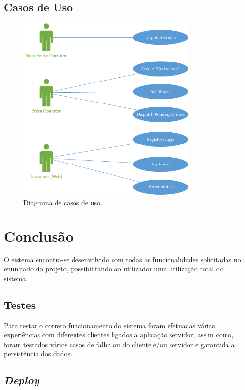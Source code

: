 \documentclass[12pt]{article}
\begin{document}
\subsection{Casos de Uso}
\begin{figure}[H]
    \centering
    \includegraphics[width=0.8\textwidth]{use.png}
    \caption{Diagrama de casos de uso.}
    \label{fig:use}
\end{figure}


\section{Conclusão}

O sistema encontra-se desenvolvido com todas as funcionalidades solicitadas no enunciado do projeto, possibilitando ao utilizador uma utilização total do sistema.

\subsection*{Testes}

Para testar o correto funcionamento do sistema foram efetuadas várias experiências com diferentes clientes ligados a aplicação servidor, assim como, foram testados vários casos de falha ou do cliente e/ou servidor e garantida a persistência dos dados.

\subsection*{\textit{Deploy}}
\end{document}

